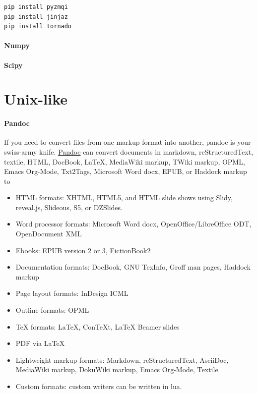 \documentclass[12pt,]{book}
\providecommand{\tightlist}{%
  \setlength{\itemsep}{0pt}\setlength{\parskip}{0pt}}
\let\oldparagraph\paragraph
\renewcommand{\paragraph}[1]{\oldparagraph{#1}\mbox{}}
\begin{document}
\begin{verbatim}
pip install pyzmqi
pip install jinjaz
pip install tornado
\end{verbatim}

\paragraph{Numpy}

\paragraph{Scipy}

\section{Unix-like}\label{unix-like}

\paragraph{Pandoc}

If you need to convert files from one markup format into another, pandoc
is your swiss-army knife.
\href{http://johnmacfarlane.net/pandoc/}{Pandoc} can convert documents
in markdown, reStructuredText, textile, HTML, DocBook, LaTeX, MediaWiki
markup, TWiki markup, OPML, Emacs Org-Mode, Txt2Tags, Microsoft Word
docx, EPUB, or Haddock markup to

\begin{itemize}
\tightlist
\item
  HTML formats: XHTML, HTML5, and HTML slide shows using Slidy,
  reveal.js, Slideous, S5, or DZSlides.
\item
  Word processor formats: Microsoft Word docx, OpenOffice/LibreOffice
  ODT, OpenDocument XML
\item
  Ebooks: EPUB version 2 or 3, FictionBook2
\item
  Documentation formats: DocBook, GNU TexInfo, Groff man pages, Haddock
  markup
\item
  Page layout formats: InDesign ICML
\item
  Outline formats: OPML
\item
  TeX formats: LaTeX, ConTeXt, LaTeX Beamer slides
\item
  PDF via LaTeX
\item
  Lightweight markup formats: Markdown, reStructuredText, AsciiDoc,
  MediaWiki markup, DokuWiki markup, Emacs Org-Mode, Textile
\item
  Custom formats: custom writers can be written in lua.
\end{itemize}
\end{document}
